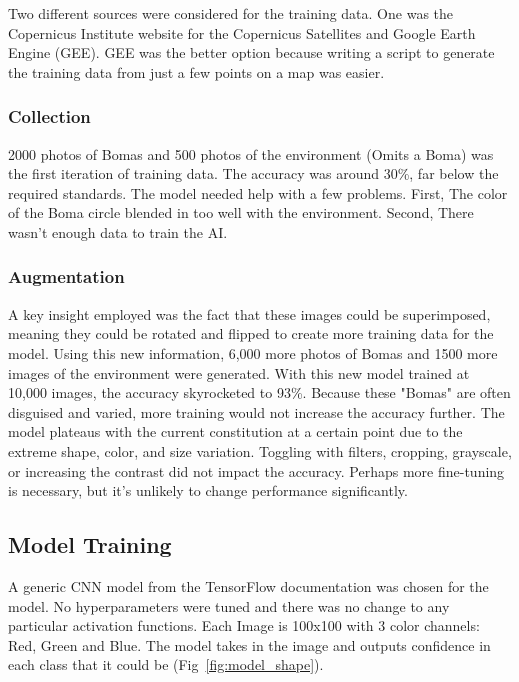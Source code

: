 \documentclass[10pt]{article}
\begin{document}
Two different sources were considered for the training data. One was the Copernicus Institute website for the Copernicus Satellites and Google Earth Engine (GEE). GEE was the better option because writing a script to generate the training data from just a few points on a map was easier.

\subsubsection{Collection}

2000 photos of Bomas and 500 photos of the environment (Omits a Boma) was the first iteration of training data. The accuracy was around 30\%, far below the required standards. The model needed help with a few problems. First, The color of the Boma circle blended in too well with the environment. Second, There wasn’t enough data to train the AI.


\subsubsection{Augmentation}

A key insight employed was the fact that these images could be superimposed, meaning they could be rotated and flipped to create more training data for the model. Using this new information, 6,000 more photos of Bomas and 1500 more images of the environment were generated. With this new model trained at 10,000 images, the accuracy skyrocketed to 93\%. Because these "Bomas" are often disguised and varied, more training would not increase the accuracy further. The model plateaus with the current constitution at a certain point due to the extreme shape, color, and size variation. Toggling with filters, cropping, grayscale, or increasing the contrast did not impact the accuracy. Perhaps more fine-tuning is necessary, but it's unlikely to change performance significantly.

\subsection{Model Training}
\label{training}

A generic CNN model from the TensorFlow documentation was chosen for the model. No hyperparameters were tuned and there was no change to any particular activation functions. Each Image is 100x100 with 3 color channels: Red, Green and Blue. The model takes in the image and outputs confidence in each class that it could be (Fig~\ref{fig:model_shape}).
\end{document}
